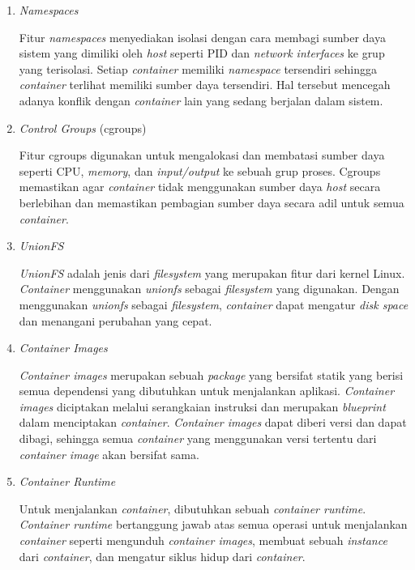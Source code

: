 \begin{enumerate}
  
  \item \emph{Namespaces}

    Fitur \emph{namespaces} menyediakan isolasi dengan cara membagi sumber daya sistem
    yang dimiliki oleh \emph{host} seperti PID dan \emph{network interfaces} ke grup
    yang terisolasi. Setiap \emph{container} memiliki \emph{namespace} tersendiri sehingga
    \emph{container} terlihat memiliki sumber daya tersendiri. Hal tersebut mencegah
    adanya konflik dengan \emph{container} lain yang sedang berjalan dalam sistem.

  \item \emph{Control Groups} (cgroups)

    Fitur cgroups digunakan untuk mengalokasi dan membatasi sumber daya seperti CPU, \emph{memory},
    dan \emph{input/output} ke sebuah grup proses. Cgroups memastikan agar \emph{container}
    tidak menggunakan sumber daya \emph{host} secara berlebihan dan memastikan pembagian sumber daya
    secara adil untuk semua \emph{container}.

  \item \emph{UnionFS}

    \emph{UnionFS} adalah jenis dari \emph{filesystem} yang merupakan fitur dari kernel Linux. \emph{Container}
    menggunakan \emph{unionfs} sebagai \emph{filesystem} yang digunakan. Dengan menggunakan
    \emph{unionfs} sebagai \emph{filesystem}, \emph{container} dapat mengatur \emph{disk space}
    dan menangani perubahan yang cepat.

  \item \emph{Container Images}

    \emph{Container images} merupakan sebuah \emph{package} yang bersifat statik yang berisi
    semua dependensi yang dibutuhkan untuk menjalankan aplikasi. \emph{Container images} diciptakan
    melalui serangkaian instruksi dan merupakan \emph{blueprint} dalam menciptakan \emph{container}.
    \emph{Container images} dapat diberi versi dan dapat dibagi, sehingga semua \emph{container}
    yang menggunakan versi tertentu dari \emph{container image} akan bersifat sama.

  \item \emph{Container Runtime}

    Untuk menjalankan \emph{container}, dibutuhkan sebuah \emph{container runtime}. \emph{Container runtime}
    bertanggung jawab atas semua operasi untuk menjalankan \emph{container} seperti mengunduh
    \emph{container images}, membuat sebuah \emph{instance} dari \emph{container}, dan mengatur
    siklus hidup dari \emph{container}.

\end{enumerate}

